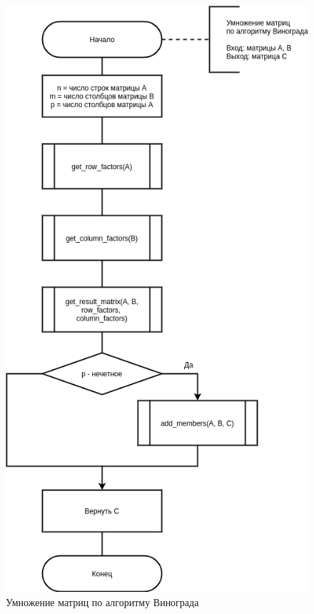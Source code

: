 \begin{figure}[H]
	\begin{center}
		\includegraphics[scale=0.6]{img/winograd.png}
	\end{center}
	\captionsetup{justification=centering}
	\caption{Умножение матриц по алгоритму Винограда}
	\label{img:winograd}
\end{figure}

